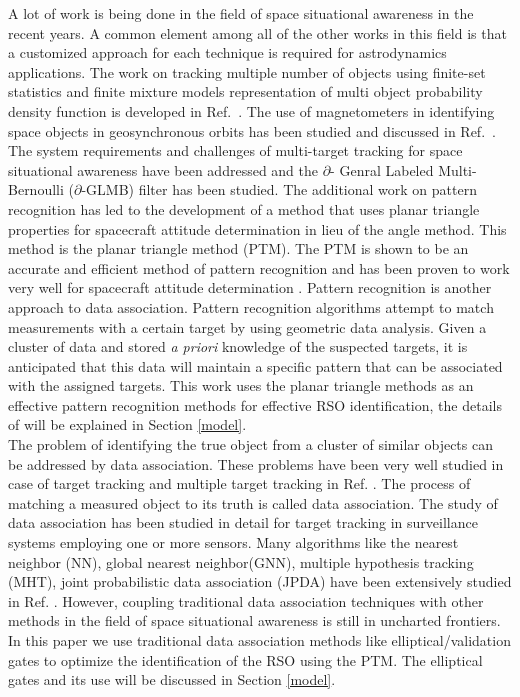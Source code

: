 \documentclass[]{aiaa-tc}%
\begin{document}
A lot of work is being done in the field of space situational awareness in the recent years. A common element among all of the other works in this field is that a customized approach for
each technique is required for astrodynamics applications. The work on tracking multiple number of objects using finite-set statistics and finite mixture models representation of multi object probability density function is developed in Ref.~. The use of magnetometers in identifying space objects in geosynchronous orbits has been studied and discussed in Ref.~. The system requirements and challenges of multi-target tracking for space situational awareness have been addressed and the $\partial$- Genral Labeled Multi-Bernoulli ($\partial$-GLMB) filter has been studied. The additional work on pattern recognition has led to the development of a method that uses planar triangle properties for spacecraft attitude determination in lieu of the angle method.  This method is the planar triangle method (PTM). The PTM is shown to be an accurate and efficient method of pattern recognition and has been proven to work very well for spacecraft attitude determination \cite{cole_fast_2006}. Pattern recognition is another approach to data association. Pattern recognition algorithms attempt to match measurements with a certain target by using geometric data analysis. Given a cluster of data and stored \textit{a priori} knowledge of the suspected targets, it is anticipated that this data will maintain a specific pattern that can be associated with the assigned targets. This work uses the planar triangle methods as an effective pattern recognition methods for effective RSO identification, the details of will be explained in Section \ref{model}.\\ 

The problem of identifying the true object from a cluster of similar objects can be addressed by data association. These problems have been very well studied in case of target tracking and multiple target tracking in  Ref. . The process of matching a measured object to its truth is called data association. The study of data association has been studied in detail for target tracking in surveillance systems employing one or more sensors. Many algorithms like the nearest neighbor (NN), global nearest neighbor(GNN), multiple hypothesis tracking (MHT), joint probabilistic data association (JPDA) have been extensively studied in Ref. . However, coupling traditional data association techniques with other methods in the field of space situational awareness is still in uncharted frontiers. In this paper we use traditional data association methods like elliptical/validation gates to optimize the identification of the RSO using the PTM. The elliptical gates and its use will be discussed in Section \ref{model}.
\end{document}
